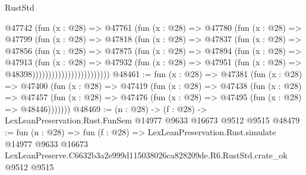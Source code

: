 \begin{lexlean}{RustStd}
\begin{coremodule}
                          @47742
                            (fun (x : @28) =>
                            @47761
                              (fun (x : @28) =>
                              @47780
                                (fun (x : @28) =>
                                @47799
                                  (fun (x : @28) =>
                                  @47818
                                    (fun (x : @28) =>
                                    @47837
                                      (fun (x : @28) =>
                                      @47856
                                        (fun (x : @28) =>
                                        @47875
                                          (fun (x : @28) =>
                                          @47894
                                            (fun (x : @28) =>
                                            @47913
                                              (fun (x : @28) =>
                                              @47932
                                                (fun (x : @28) =>
                                                @47951
                                                  (fun (x : @28) => @48398))))))))))))))))))))))))
@48461 := fun (x : @28) =>
  @47381
    (fun (x : @28) =>
    @47400
      (fun (x : @28) =>
      @47419
        (fun (x : @28) =>
        @47438
          (fun (x : @28) =>
          @47457 (fun (x : @28) => @47476 (fun (x : @28) => @47495 (fun (x : @28) => @48446)))))))
@48469 := (n : @28) -> (f : @28) -> LexLeanPreservation.Rust.FunSem @14977 @9633 @16673 @9512 @9515
@48479 := fun (n : @28) =>
  fun (f : @28) =>
  LexLeanPreservation.Rust.simulate
    @14977
    @9633
    @16673
    LexLeanPreserve.C6632b3a2e999d115038026ca828209de.R6.RustStd.crate_ok
    @9512
    @9515
\end{coremodule}
\end{lexlean}
